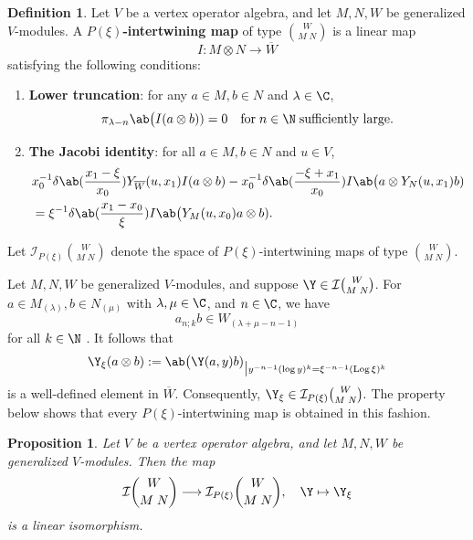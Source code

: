\documentclass[12pt, english]{article}
\numberwithin{equation}{section}
\DeclareMathOperator{\Log}{Log}
\theoremstyle{plain}
\newtheorem{proposition}[lemma]{Proposition}
\theoremstyle{definition}
\newtheorem{definition}[lemma]{Definition}
\theoremstyle{remark}
\begin{document}
	
	
	\begin{definition}
		Let $V$ be a vertex operator algebra, and let $M, N, W$ be generalized $V$-modules.
		A \textbf{ $P(\xi)$-intertwining map } of type $\binom{W}{M \; N}$ is a linear map
		\[
		I \colon M \otimes N \longrightarrow \overline{W}
		\]
		satisfying the following conditions:
		\begin{enumerate}[label=(\arabic*),ref=\arabic*]
			\item \textbf{Lower truncation}: for any $a \in M, b \in N$ and $\lambda \in \C$,
			\[
			\pi_{\lambda-n} \ab\big(I(a \otimes b)) = 0 \quad \text{for} \; n \in \N \; \text{sufficiently large.}
			\]
			
			\item \textbf{The Jacobi identity}: for all $a \in M, b \in N$ and $u \in V$,
			\begin{align*} \label{eq:p-intertwining-jacobi}
				& x_0^{-1} \delta \ab(\frac{x_1- \xi}{x_0}) Y_{\overline{W}}(u, x_1) I(a \otimes b)
				-x_0^{-1} \delta \ab(\frac{-\xi+x_1}{x_0}) I \ab\big(a \otimes Y_{N}(u, x_1) b) \\
				& = {\xi}^{-1} \delta \ab(\frac{x_1-x_0}{\xi}) I \ab\big(Y_{M}(u, x_0) a \otimes b).
			\end{align*}
		\end{enumerate}
		Let $ \mathcal{I}_{P(\xi)}\binom{W}{M \; N} $ denote the space of $P(\xi)$-intertwining maps of type $\binom{W}{M \; N}$.
		
	\end{definition}
	
	Let $M, N, W$ be generalized $V$-modules, and suppose $\Y \in \mathcal{I}\binom{W}{M \; N}$.
	For $a \in M_{(\lambda)}, b \in N_{(\mu)}$ with $\lambda, \mu \in \C$, and $n \in \C$, we have
	\[
	a_{n; k}b \in W_{(\lambda +\mu -n-1)}
	\]
	for all $k \in \N$ \cite{HLZ10II, YZ26a}. It follows that
	\[
	\Y_{\xi}(a \otimes b) := \ab\big(\Y(a, y) b)_{ \big | y^{-n-1} (\log y)^k = {\xi}^{-n-1} (\Log \xi)^k }
	\]
	is a well-defined element in $\overline{W}$. Consequently, $\Y_{\xi} \in \mathcal{I}_{P(\xi)}\binom{W}{M \; N}.$
	The property below shows that every $P(\xi)$-intertwining map is obtained in this fashion.
	
	\begin{proposition} \cite{HLZ10III} \label{prop:intertwiner-evaluation}
		Let $V$ be a vertex operator algebra, and let $M, N, W$ be generalized $V$-modules.
		Then the map
		\[
		\mathcal{I}\binom{W}{M \; N} \longrightarrow \mathcal{I}_{P(\xi)}\binom{W}{M \; N}, \quad \Y \mapsto \Y_{\xi}
		\]
		is a linear isomorphism.
		
	\end{proposition}
	
\end{document}
